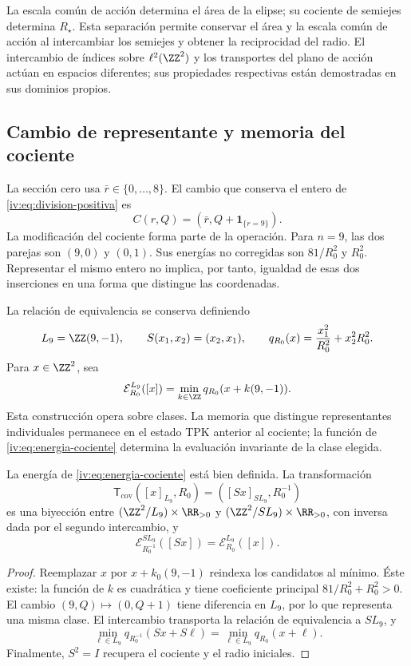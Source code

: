 La escala común de acción determina el área de la elipse; su cociente
de semiejes determina \(R_\star\). Esta separación permite conservar
el área y la escala común de acción al intercambiar los semiejes y obtener la reciprocidad
del radio. El intercambio de índices sobre \(\ell^2(\ZZ^2)\)
y los transportes del plano de acción actúan en espacios diferentes;
sus propiedades respectivas están demostradas en sus dominios propios.

\subsection{Cambio de representante y memoria del cociente}

La sección cero usa \(\bar r\in\{0,\ldots,8\}\). El cambio
que conserva el entero de \eqref{iv:eq:division-positiva} es
\begin{equation}
 C(r,Q)=(\bar r,Q+\mathbf1_{\{r=9\}}).
 \label{iv:eq:cambio-seccion}
\end{equation}
La modificación del cociente forma parte de la operación.
Para \(n=9\), las dos parejas son \((9,0)\) y \((0,1)\).
Sus energías no corregidas son \(81/R_0^2\) y \(R_0^2\).
Representar el mismo entero no implica, por tanto, igualdad de
esas dos inserciones en una forma que distingue las coordenadas.

La relación de equivalencia se conserva definiendo
\[
 L_9=\ZZ(9,-1),\qquad S(x_1,x_2)=(x_2,x_1),
 \qquad q_{R_0}(x)=\frac{x_1^2}{R_0^2}+x_2^2R_0^2.
\]
Para \(x\in\ZZ^2\), sea
\begin{equation}
 \mathcal E_{R_0}^{L_9}([x])
 =\min_{k\in\ZZ}q_{R_0}(x+k(9,-1)).
 \label{iv:eq:energia-cociente}
\end{equation}
Esta construcción opera sobre clases. La memoria que distingue
representantes individuales permanece en el estado TPK anterior
al cociente; la función de \eqref{iv:eq:energia-cociente}
determina la evaluación invariante de la clase elegida.

\begin{theorem}
\label{iv:thm:dualidad-cociente}
La energía de \eqref{iv:eq:energia-cociente} está bien definida.
La transformación
\[
 \mathsf T_{\mathrm{cov}}([x]_{L_9},R_0)
 =([Sx]_{SL_9},R_0^{-1})
\]
es una biyección entre
\((\ZZ^2/L_9)\times\RR_{>0}\) y
\((\ZZ^2/SL_9)\times\RR_{>0}\), con inversa dada por el
segundo intercambio, y
\[
 \mathcal E_{R_0^{-1}}^{SL_9}([Sx])
 =\mathcal E_{R_0}^{L_9}([x]).
\]
\end{theorem}
\begin{proof}
Reemplazar \(x\) por \(x+k_0(9,-1)\) reindexa los candidatos
al mínimo. Éste existe: la función de \(k\) es cuadrática y
tiene coeficiente principal \(81/R_0^2+R_0^2>0\). El cambio
\((9,Q)\mapsto(0,Q+1)\) tiene diferencia en \(L_9\), por
lo que representa una misma clase. El intercambio transporta
la relación de equivalencia a \(SL_9\), y
\[
 \min_{\ell\in L_9}q_{R_0^{-1}}(Sx+S\ell)
 =\min_{\ell\in L_9}q_{R_0}(x+\ell).
\]
Finalmente, \(S^2=I\) recupera el cociente y el radio iniciales.
\end{proof}

